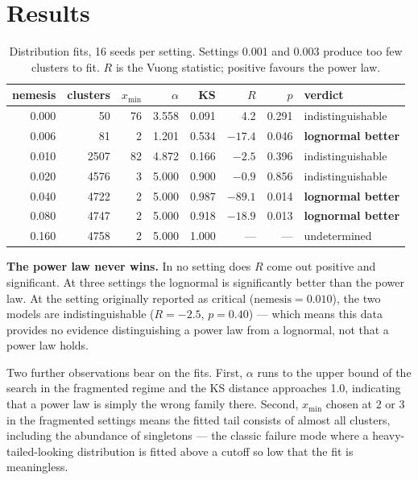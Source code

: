 \documentclass[11pt]{article}
\begin{document}
\section{Results}

\begin{table}[h]
\centering
\small
\begin{tabular}{rrrrrrrl}
\toprule
\textbf{nemesis} & \textbf{clusters} & $x_{\min}$ & $\alpha$ & \textbf{KS} & $R$ & $p$ & \textbf{verdict} \\
\midrule
0.000 & 50   & 76 & 3.558 & 0.091 & 4.2   & 0.291 & indistinguishable \\
0.006 & 81   & 2  & 1.201 & 0.534 & $-17.4$ & 0.046 & \textbf{lognormal better} \\
0.010 & 2507 & 82 & 4.872 & 0.166 & $-2.5$ & 0.396 & indistinguishable \\
0.020 & 4576 & 3  & 5.000 & 0.900 & $-0.9$ & 0.856 & indistinguishable \\
0.040 & 4722 & 2  & 5.000 & 0.987 & $-89.1$ & 0.014 & \textbf{lognormal better} \\
0.080 & 4747 & 2  & 5.000 & 0.918 & $-18.9$ & 0.013 & \textbf{lognormal better} \\
0.160 & 4758 & 2  & 5.000 & 1.000 & --- & --- & undetermined \\
\bottomrule
\end{tabular}
\caption{Distribution fits, 16 seeds per setting. Settings 0.001 and 0.003
produce too few clusters to fit. $R$ is the Vuong statistic; positive
favours the power law.}
\label{tab:fits}
\end{table}

\textbf{The power law never wins.} In no setting does $R$ come out
positive and significant. At three settings the lognormal is significantly
better than the power law. At the setting originally reported as critical
($\text{nemesis} = 0.010$), the two models are indistinguishable
($R = -2.5$, $p = 0.40$) --- which means this data provides no evidence
distinguishing a power law from a lognormal, not that a power law holds.

Two further observations bear on the fits. First, $\alpha$ runs to the
upper bound of the search in the fragmented regime and the KS distance
approaches 1.0, indicating that a power law is simply the wrong family
there. Second, $x_{\min}$ chosen at 2 or 3 in the fragmented settings means
the fitted tail consists of almost all clusters, including the abundance of
singletons --- the classic failure mode where a heavy-tailed-looking
distribution is fitted above a cutoff so low that the fit is meaningless.
\end{document}
